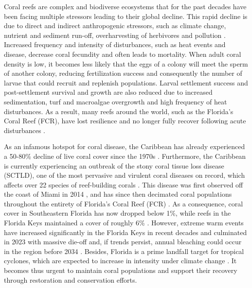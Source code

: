 \documentclass[preprint,12pt,authoryear]{elsarticle}
\begin{document}
	Coral reefs are complex and biodiverse ecosystems that for the past decades have been facing multiple stressors leading to their global decline. This rapid decline is due to direct and indirect anthropogenic stressors, such as climate change, nutrient and sediment run-off, overharvesting of herbivores and pollution \citep{hughes2003climate, hughes2018spatial, hoegh2007coral, hoegh2017coral}. Increased frequency and intensity of disturbances, such as heat events and disease, decrease coral fecundity and often leads to mortality. When adult coral density is low, it becomes less likely that the eggs of a colony will meet the sperm of another colony, reducing fertilization success and consequently the number of larvae that could recruit and replenish populations. Larval settlement success and post-settlement survival and growth are also reduced due to increased sedimentation, turf and macroalgae overgrowth and high frequency of heat disturbances. As a result, many reefs around the world, such as the Florida’s Coral Reef (FCR), have lost resilience and no longer fully recover following acute disturbances \citep{jones2022frequent}.
	
	As an infamous hotspot for coral disease, the Caribbean has already experienced a 50-80\% decline of live coral cover since the 1970s \citep{gardner2003long,jackson2014status}. Furthermore, the Caribbean is currently experiencing an outbreak of the stony coral tissue loss disease (SCTLD), one of the most pervasive and virulent coral diseases on record, which affects over 22 species of reef-building corals \citep{noaa2018,meiling2021variable}. This disease was first observed off the coast of Miami in 2014 \citep{precht2016unprecedented}, and has since then decimated coral populations throughout the entirety of Florida's Coral Reef (FCR) \citep{williams2021fine,frrp2021}. As a consequence, coral cover in Southeastern Florida has now dropped below 1\%, while reefs in the Florida Keys maintained a cover of roughly 6\% \citep{grove2022national}. However, extreme warm events have increased significantly in the Florida Keys in recent decades and culminated in 2023 with massive die-off \citep{neely2024too} and, if trends persist, annual bleaching could occur in the region before 2034 \citep{manzello2015rapid}. Besides, Florida is a prime landfall target for tropical cyclones, which are expected to increase in intensity under climate change \citep{dobbelaere2024hurricanes}. It becomes thus urgent to maintain coral populations and support their recovery through restoration and conservation efforts.
	
\end{document}
